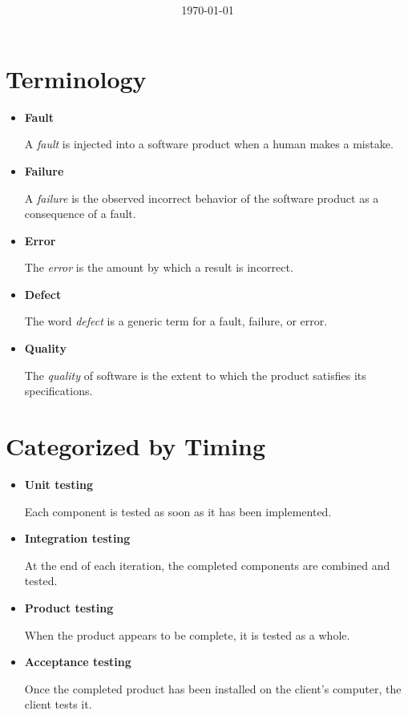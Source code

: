 \documentclass[11pt]{article}
\title{\textbf{\Topic}}
\author{\Name}
\date{\today}
\begin{document}
\maketitle
\noindent\makebox[\linewidth]{\rule[8pt]{5in}{0.5pt}}

\section*{Terminology}

\begin{itemize}
	\item \textbf{Fault}
	
	A \textit{fault} is injected into a software product when a human makes a mistake.
	
	\item \textbf{Failure}
	
	A \textit{failure} is the observed incorrect behavior of the software product as a consequence of a fault.
	
	\item \textbf{Error}
	
	The \textit{error} is the amount by which a result is incorrect.
	
	\item \textbf{Defect}
	
	The word \textit{defect} is a generic term for a fault, failure, or error.
	
	\item \textbf{Quality}
	
	The \textit{quality} of software is the extent to which the product satisfies its specifications.
\end{itemize}

\section*{Categorized by Timing}

\begin{itemize}
	\item \textbf{Unit testing}
	
	Each component is tested as soon as it has been implemented.
	
	\item \textbf{Integration testing}
	
	At the end of each iteration, the completed components are combined and tested.
	
	\item \textbf{Product testing}
	
	When the product appears to be complete, it is tested as a whole.
	
	\item \textbf{Acceptance testing}
	
	Once the completed product has been installed on the client’s computer, the client tests it.
\end{itemize}
\end{document}
